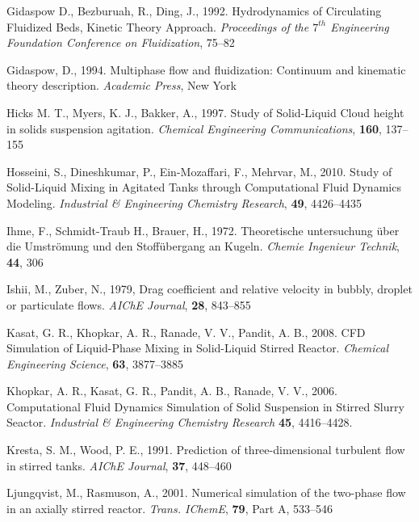 \begin{thebibliography}{99}
 Gidaspow D., Bezburuah, R., Ding, J., 1992. Hydrodynamics of Circulating Fluidized Beds, Kinetic Theory Approach. \textit{Proceedings of the $7^{th}$ Engineering Foundation Conference on Fluidization}, 75--82

 Gidaspow, D., 1994. Multiphase flow and fluidization: Continuum and kinematic theory description. \textit{Academic Press}, New York

 Hicks M. T., Myers, K. J.,  Bakker, A., 1997. Study of Solid-Liquid Cloud height in solids suspension agitation. \textit{Chemical Engineering Communications}, \textbf{160}, 137--155

 Hosseini, S., Dineshkumar, P., Ein-Mozaffari, F., Mehrvar, M., 2010. Study of Solid-Liquid Mixing in Agitated Tanks through Computational Fluid Dynamics Modeling. \textit{Industrial \& Engineering Chemistry Research}, \textbf{49}, 4426--4435

 Ihme, F., Schmidt-Traub H., Brauer, H., 1972. Theoretische untersuchung \"uber die Umstr\"omung und den Stoff\"ubergang an Kugeln. \textit{Chemie Ingenieur Technik}, \textbf{44}, 306

 Ishii, M., Zuber, N., 1979, Drag coefficient and relative velocity in bubbly, droplet or particulate flows. \textit{AIChE Journal}, \textbf{28}, 843--855 

 Kasat, G. R., Khopkar, A. R., Ranade, V. V., Pandit, A. B., 2008. CFD Simulation of Liquid-Phase Mixing in Solid-Liquid Stirred Reactor. \textit{Chemical Engineering Science}, \textbf{63}, 3877--3885

 Khopkar, A. R., Kasat, G. R., Pandit, A. B., Ranade, V. V., 2006. Computational Fluid Dynamics Simulation of Solid Suspension in Stirred Slurry Seactor. \textit{Industrial \& Engineering Chemistry Research} \textbf{45}, 4416--4428.

 Kresta, S. M., Wood, P. E., 1991. Prediction of three-dimensional turbulent flow in stirred tanks. \textit{AIChE Journal}, \textbf{37}, 448--460 

 Ljungqvist, M., Rasmuson, A., 2001. Numerical simulation of the two-phase flow in an axially stirred reactor. \textit{Trans. IChemE}, \textbf{79}, Part A, 533--546


\end{thebibliography}
